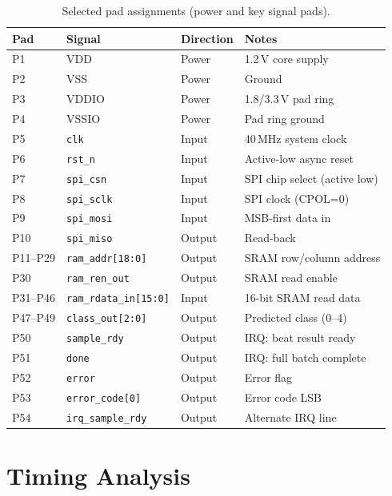 \documentclass[11pt]{article}
\begin{document}
\begin{table}[H]
  \centering
  \caption{Selected pad assignments (power and key signal pads).}
  \label{tab:pads}
  \small
  \begin{tabular}{llll}
    \toprule
    Pad & Signal & Direction & Notes \\
    \midrule
    P1  & VDD  & Power  & 1.2\,V core supply \\
    P2  & VSS  & Power  & Ground \\
    P3  & VDDIO & Power & 1.8/3.3\,V pad ring \\
    P4  & VSSIO & Power & Pad ring ground \\
    P5  & \texttt{clk}      & Input  & 40\,MHz system clock \\
    P6  & \texttt{rst\_n}   & Input  & Active-low async reset \\
    P7  & \texttt{spi\_csn} & Input  & SPI chip select (active low) \\
    P8  & \texttt{spi\_sclk} & Input & SPI clock (CPOL=0) \\
    P9  & \texttt{spi\_mosi} & Input & MSB-first data in \\
    P10 & \texttt{spi\_miso} & Output & Read-back \\
    P11--P29 & \texttt{ram\_addr[18:0]} & Output & SRAM row/column address \\
    P30 & \texttt{ram\_ren\_out} & Output & SRAM read enable \\
    P31--P46 & \texttt{ram\_rdata\_in[15:0]} & Input & 16-bit SRAM read data \\
    P47--P49 & \texttt{class\_out[2:0]} & Output & Predicted class (0--4) \\
    P50 & \texttt{sample\_rdy} & Output & IRQ: beat result ready \\
    P51 & \texttt{done}        & Output & IRQ: full batch complete \\
    P52 & \texttt{error}       & Output & Error flag \\
    P53 & \texttt{error\_code[0]} & Output & Error code LSB \\
    P54 & \texttt{irq\_sample\_rdy} & Output & Alternate IRQ line \\
    \bottomrule
  \end{tabular}
\end{table}

\section{Timing Analysis}
\end{document}
